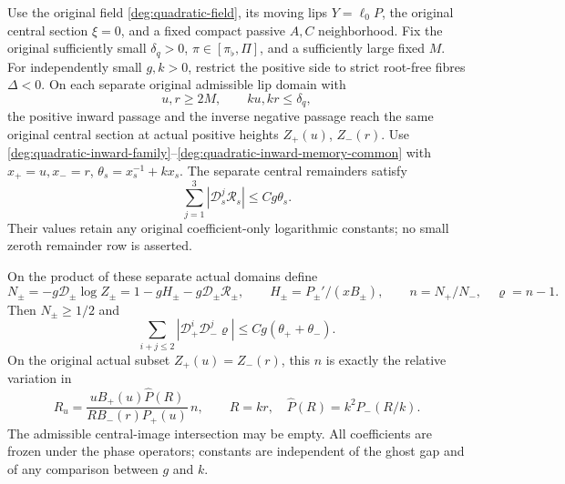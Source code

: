 \begin{lemma}\label{deg:lem-joint-inward-product-direct}
Use the original field \eqref{deg:quadratic-field}, its moving lips
\(Y=\ell_0P\), the original central section \(\xi=0\), and a fixed
compact passive \(A,C\) neighborhood. Fix the original sufficiently
small \(\delta_q>0\), \(\pi\in[\pi_\flat,\Pi]\), and a sufficiently
large fixed \(M\). For independently small \(g,k>0\), restrict the
positive side to strict root-free fibres \(\Delta<0\). On each separate
original admissible lip domain with
\[
 u,r\ge2M,\qquad ku,kr\le\delta_q,
\]
the positive inward passage and the inverse negative passage reach
the same original central section at actual positive heights
\(Z_+(u)\), \(Z_-(r)\). Use \eqref{deg:quadratic-inward-family}--\eqref{deg:quadratic-inward-memory-common}
with \(x_+=u,x_-=r\), \(\theta_s=x_s^{-1}+kx_s\).
The separate central remainders satisfy
\[
 \sum_{j=1}^3|\mathcal D_s^j\mathcal R_s|\le Cg\theta_s.
\]
Their values retain any original coefficient-only logarithmic constants;
no small zeroth remainder row is asserted.

On the product of these separate actual domains define
\[
 N_\pm=-g\mathcal D_\pm\log Z_\pm
       =1-gH_\pm-g\mathcal D_\pm\mathcal R_\pm,\qquad
 H_\pm=P_\pm'/(xB_\pm),\qquad n=N_+/N_-,\quad\varrho=n-1 .
\]
Then \(N_\pm\ge1/2\) and
\begin{equation}\label{deg:joint-inward-product-direct-jets}
 \sum_{i+j\le2}|\mathcal D_+^i\mathcal D_-^j\varrho|
                 \le Cg(\theta_++\theta_-).
\end{equation}
On the original actual subset \(Z_+(u)=Z_-(r)\), this \(n\) is exactly
the relative variation in
\[
 R_u=\frac{uB_+(u)\widehat P(R)}{RB_-(r)P_+(u)}\,n,
 \qquad R=kr,\quad \widehat P(R)=k^2P_-(R/k).
\]
The admissible central-image intersection may be empty. All coefficients
are frozen under the phase operators; constants are independent of the
ghost gap and of any comparison between \(g\) and \(k\).
\end{lemma}

